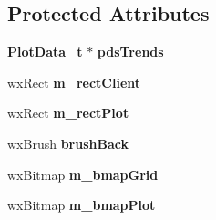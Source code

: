 \subsection*{Protected Attributes}
\begin{DoxyCompactItemize}
\item 
{\bf PlotData\_\-t} $\ast$ {\bfseries pdsTrends}\label{classCOScopeCtrl_a6a585b9eb939b2874fcf5c0acc310e0d}

\item 
wxRect {\bfseries m\_\-rectClient}\label{classCOScopeCtrl_a8b98dd39a32dee43a142616ff65cfa75}

\item 
wxRect {\bfseries m\_\-rectPlot}\label{classCOScopeCtrl_a992b428236df9fda2ee0f37ba8782a00}

\item 
wxBrush {\bfseries brushBack}\label{classCOScopeCtrl_a4813d8f52656e3a8b8f8faeae8aeef73}

\item 
wxBitmap {\bfseries m\_\-bmapGrid}\label{classCOScopeCtrl_a9a32e7c63ddcc4952b0e9307b1f0c4ff}

\item 
wxBitmap {\bfseries m\_\-bmapPlot}\label{classCOScopeCtrl_a11b3ccf6a85315b750edd4363194e94e}

\end{DoxyCompactItemize}
